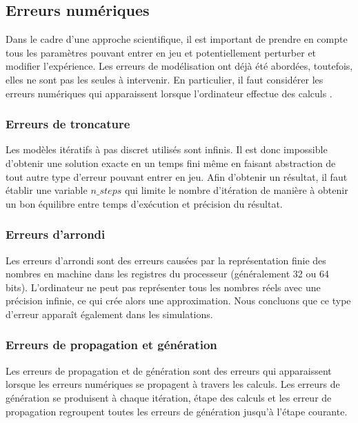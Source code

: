 \documentclass[
	a4paper, %
	10pt, %
	unnumberedsections, %
	twoside, %
]{LTJournalArticle}
\begin{document}
\subsection{Erreurs numériques}

Dans le cadre d'une approche scientifique, il est important de prendre en
compte tous les paramètres pouvant entrer en jeu et potentiellement perturber
et modifier l'expérience.
Les erreurs de modélisation ont déjà été abordées, toutefois, elles ne 
sont pas les seules à intervenir. En particulier, il faut considérer
les erreurs numériques qui apparaissent lorsque l'ordinateur effectue des
calculs \cite[16]{Marteen:2022}.

\subsubsection{Erreurs de troncature}

Les modèles itératifs à pas discret utilisés sont infinis. Il est donc impossible
d'obtenir une solution exacte en un temps fini même en faisant abstraction de
tout autre type d'erreur pouvant entrer en jeu. Afin d'obtenir un résultat,
il faut établir une variable $n\_steps$ qui limite le nombre d'itération de
manière à obtenir un bon équilibre entre temps d'exécution et précision du
résultat.

\subsubsection{Erreurs d'arrondi}

Les erreurs d'arrondi sont des erreurs causées par la représentation finie des
nombres en machine dans les registres du processeur (généralement 32 ou 64
bits). L'ordinateur ne peut pas représenter tous les nombres réels avec une
précision infinie, ce qui crée alors une approximation. Nous concluons que ce type
d’erreur apparaît également dans les simulations.

\subsubsection{Erreurs de propagation et génération}

Les erreurs de propagation et de génération sont des erreurs qui apparaissent
lorsque les erreurs numériques se propagent à travers les calculs. Les erreurs
de génération se produisent à chaque itération, étape des calculs et les erreur
de propagation regroupent toutes les erreurs de génération jusqu'à l'étape
courante.
\end{document}
